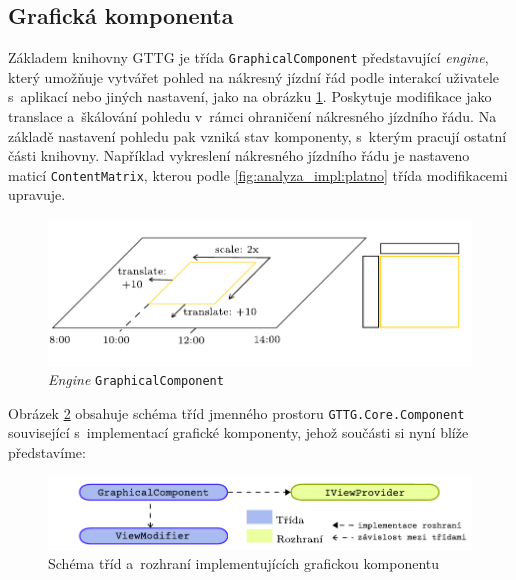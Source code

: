 \subsection{Grafická komponenta}
\label{kap4:graphical_component}
Základem knihovny GTTG je třída \texttt{GraphicalComponent} představující \textit{engine}, který umožňuje vytvářet pohled na nákresný jízdní řád podle interakcí uživatele s~aplikací nebo jiných nastavení, jako na obrázku \ref{fig:kap4:gttg-core-graphical-component}. Poskytuje modifikace jako translace a~škálování pohledu v~rámci ohraničení nákresného jízdního řádu. Na základě nastavení pohledu pak vzniká stav komponenty, s~kterým pracují ostatní části knihovny. Například vykreslení nákresného jízdního řádu je nastaveno maticí \texttt{ContentMatrix},  kterou podle \ref{fig:analyza_impl:platno} třída modifikacemi upravuje.

\begin{figure}[!hbt]
	\includegraphics[width=\textwidth]{../img/kap4_gttg-core-graphical-compont}
	\caption{\textit{Engine} \texttt{GraphicalComponent}}
	\label{fig:kap4:gttg-core-graphical-component}
\end{figure}

Obrázek \ref{fig:kap4:gttg-core-component_structure_diagram} obsahuje schéma tříd jmenného prostoru \texttt{GTTG.Core.Component} související s~implementací grafické komponenty, jehož součásti si nyní blíže představíme:

\begin{figure}[!hbt]
	\includegraphics[width=\textwidth]{../img/kap4_gttg-core-component_structure_diagram}
	\caption{Schéma tříd a~rozhraní implementujících grafickou komponentu}
	\label{fig:kap4:gttg-core-component_structure_diagram}
\end{figure}

